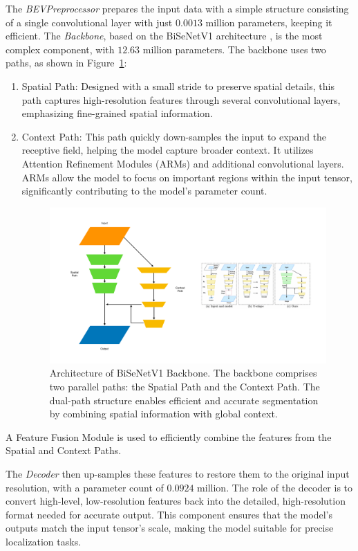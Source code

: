 The \textit{BEVPreprocessor} prepares the input data with a simple structure consisting of a single convolutional layer with just $0.0013$ million parameters, keeping it efficient. 
The \textit{Backbone}, based on the BiSeNetV1 architecture \cite{DBLP:journals/corr/abs-1808-00897}, is the most complex component, with $12.63$ million parameters. The backbone uses two paths, as shown in Figure~\ref{fig:bisenetv1}: 
\begin{enumerate}
    \item Spatial Path: Designed with a small stride to preserve spatial details, this path captures high-resolution features through several convolutional layers, emphasizing fine-grained spatial information.
    \item Context Path: This path quickly down-samples the input to expand the receptive field, helping the model capture broader context. It utilizes Attention Refinement Modules (ARMs) and additional convolutional layers. ARMs allow the model to focus on important regions within the input tensor, significantly contributing to the model's parameter count.
    
\begin{figure}[H]
    \centering
    \includegraphics[width=0.5\linewidth]{LateX//figs/bisenetv1.pdf}
    \caption{Architecture of BiSeNetV1 Backbone. The backbone comprises two parallel paths: the Spatial Path and the Context Path. The dual-path structure enables efficient and accurate segmentation by combining spatial information with global context.}
    \label{fig:bisenetv1}
\end{figure}

\end{enumerate}
A Feature Fusion Module is used to efficiently combine the features from the Spatial and Context Paths.

The \textit{Decoder} then up-samples these features to restore them to the original input resolution, with a parameter count of $0.0924$ million. The role of the decoder is to convert high-level, low-resolution features back into the detailed, high-resolution format needed for accurate output. This component ensures that the model’s outputs match the input tensor's scale, making the model suitable for precise localization tasks.

